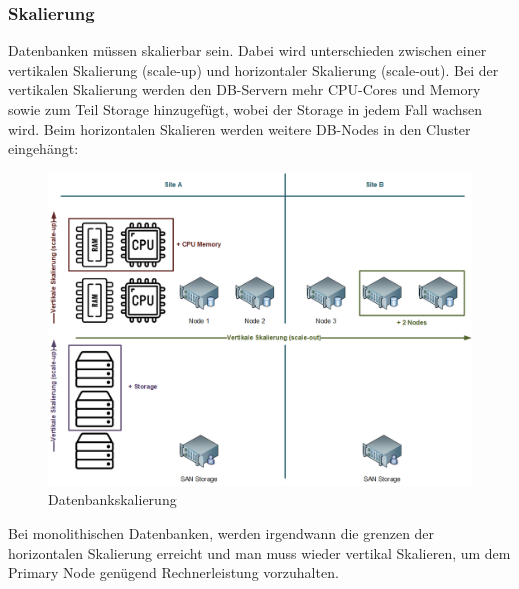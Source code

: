 
\subsubsection{Skalierung}
\begin{flushleft}
    Datenbanken müssen skalierbar sein.
    Dabei wird unterschieden zwischen einer vertikalen Skalierung (scale-up) und horizontaler Skalierung (scale-out).
    Bei der vertikalen Skalierung werden den DB-Servern mehr CPU-Cores und Memory sowie zum Teil Storage hinzugefügt, wobei der Storage in jedem Fall wachsen wird.
    Beim horizontalen Skalieren werden weitere DB-Nodes in den Cluster eingehängt\cite{IZSGZLVT}:
    \begin{figure}[H]
        \centering
        \includegraphics[width=1\linewidth]{source/implementation/evaluation/excursus_architecture/Skalierung}
        \caption{Datenbankskalierung}
        \label{fig:Datenbankskalierung}
    \end{figure}

    Bei monolithischen Datenbanken, werden irgendwann die grenzen der horizontalen Skalierung erreicht und man muss wieder vertikal Skalieren, um dem Primary Node genügend Rechnerleistung vorzuhalten.
\end{flushleft}